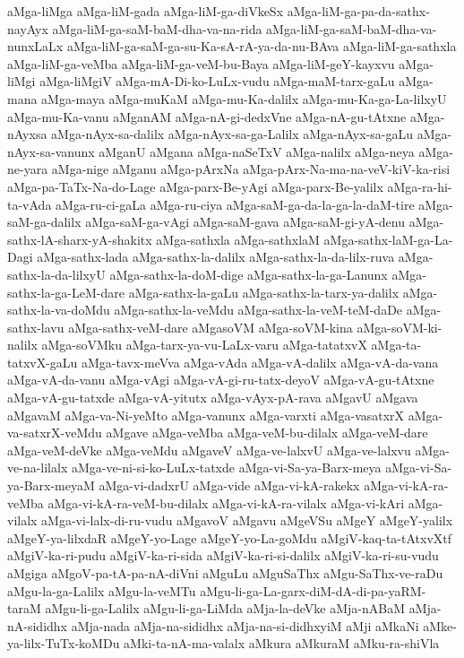 {aMga-liMga
aMga-liM-gada
aMga-liM-ga-diVkeSx
aMga-liM-ga-pa-da-sathx-nayAyx
aMga-liM-ga-saM-baM-dha-va-na-rida
aMga-liM-ga-saM-baM-dha-va-nunxLaLx
aMga-liM-ga-saM-ga-su-Ka-sA-rA-ya-da-nu-BAva
aMga-liM-ga-sathxla
aMga-liM-ga-veMba
aMga-liM-ga-veM-bu-Baya
aMga-liM-geY-kayxvu
aMga-liMgi
aMga-liMgiV
aMga-mA-Di-ko-LuLx-vudu
aMga-maM-tarx-gaLu
aMga-mana
aMga-maya
aMga-muKaM
aMga-mu-Ka-dalilx
aMga-mu-Ka-ga-La-lilxyU
aMga-mu-Ka-vanu
aMganAM
aMga-nA-gi-dedxVne
aMga-nA-gu-tAtxne
aMga-nAyxsa
aMga-nAyx-sa-dalilx
aMga-nAyx-sa-ga-Lalilx
aMga-nAyx-sa-gaLu
aMga-nAyx-sa-vanunx
aMganU
aMgana
aMga-naSeTxV
aMga-nalilx
aMga-neya
aMga-ne-yara
aMga-nige
aMganu
aMga-pArxNa
aMga-pArx-Na-ma-na-veV-kiV-ka-risi
aMga-pa-TaTx-Na-do-Lage
aMga-parx-Be-yAgi
aMga-parx-Be-yalilx
aMga-ra-hi-ta-vAda
aMga-ru-ci-gaLa
aMga-ru-ciya
aMga-saM-ga-da-la-ga-la-daM-tire
aMga-saM-ga-dalilx
aMga-saM-ga-vAgi
aMga-saM-gava
aMga-saM-gi-yA-denu
aMga-sathx-lA-sharx-yA-shakitx
aMga-sathxla
aMga-sathxlaM
aMga-sathx-laM-ga-La-Dagi
aMga-sathx-lada
aMga-sathx-la-dalilx
aMga-sathx-la-da-lilx-ruva
aMga-sathx-la-da-lilxyU
aMga-sathx-la-doM-dige
aMga-sathx-la-ga-Lanunx
aMga-sathx-la-ga-LeM-dare
aMga-sathx-la-gaLu
aMga-sathx-la-tarx-ya-dalilx
aMga-sathx-la-va-doMdu
aMga-sathx-la-veMdu
aMga-sathx-la-veM-teM-daDe
aMga-sathx-lavu
aMga-sathx-veM-dare
aMgasoVM
aMga-soVM-kina
aMga-soVM-ki-nalilx
aMga-soVMku
aMga-tarx-ya-vu-LaLx-varu
aMga-tatatxvX
aMga-ta-tatxvX-gaLu
aMga-tavx-meVva
aMga-vAda
aMga-vA-dalilx
aMga-vA-da-vana
aMga-vA-da-vanu
aMga-vAgi
aMga-vA-gi-ru-tatx-deyoV
aMga-vA-gu-tAtxne
aMga-vA-gu-tatxde
aMga-vA-yitutx
aMga-vAyx-pA-rava
aMgavU
aMgava
aMgavaM
aMga-va-Ni-yeMto
aMga-vanunx
aMga-varxti
aMga-vasatxrX
aMga-va-satxrX-veMdu
aMgave
aMga-veMba
aMga-veM-bu-dilalx
aMga-veM-dare
aMga-veM-deVke
aMga-veMdu
aMgaveV
aMga-ve-lalxvU
aMga-ve-lalxvu
aMga-ve-na-lilalx
aMga-ve-ni-si-ko-LuLx-tatxde
aMga-vi-Sa-ya-Barx-meya
aMga-vi-Sa-ya-Barx-meyaM
aMga-vi-dadxrU
aMga-vide
aMga-vi-kA-rakekx
aMga-vi-kA-ra-veMba
aMga-vi-kA-ra-veM-bu-dilalx
aMga-vi-kA-ra-vilalx
aMga-vi-kAri
aMga-vilalx
aMga-vi-lalx-di-ru-vudu
aMgavoV
aMgavu
aMgeVSu
aMgeY
aMgeY-yalilx
aMgeY-ya-lilxdaR
aMgeY-yo-Lage
aMgeY-yo-La-goMdu
aMgiV-kaq-ta-tAtxvXtf
aMgiV-ka-ri-pudu
aMgiV-ka-ri-sida
aMgiV-ka-ri-si-dalilx
aMgiV-ka-ri-su-vudu
aMgiga
aMgoV-pa-tA-pa-nA-diVni
aMguLu
aMguSaThx
aMgu-SaThx-ve-raDu
aMgu-la-ga-Lalilx
aMgu-la-veMTu
aMgu-li-ga-La-garx-diM-dA-di-pa-yaRM-taraM
aMgu-li-ga-Lalilx
aMgu-li-ga-LiMda
aMja-la-deVke
aMja-nABaM
aMja-nA-sididhx
aMja-nada
aMja-na-sididhx
aMja-na-si-didhxyiM
aMji
aMkaNi
aMke-ya-lilx-TuTx-koMDu
aMki-ta-nA-ma-valalx
aMkura
aMkuraM
aMku-ra-shiVla
}
